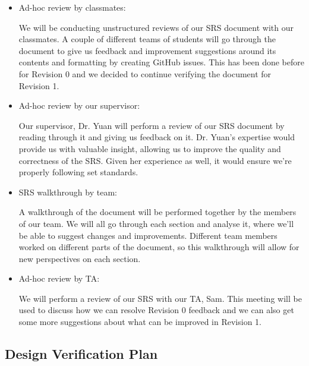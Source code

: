 \documentclass[12pt, titlepage]{article}
\begin{document}
\begin{itemize}
  \item Ad-hoc review by classmates:

      We will be conducting unstructured reviews of our SRS document with our classmates. A couple of different teams of students will go through the document to give us feedback and improvement suggestions around its contents and formatting by creating GitHub issues. This has been done before for Revision 0 and we decided to continue verifying the document for Revision 1.
  
  \item Ad-hoc review by our supervisor:

      Our supervisor, Dr. Yuan will perform a review of our SRS document by reading through it and giving us feedback on it. Dr. Yuan's expertise would provide us with valuable insight, allowing us to improve the quality and correctness of the SRS. Given her experience as well, it would ensure we're properly following set standards.

    \item SRS walkthrough by team:

      A walkthrough of the document will be performed together by the members of our team. We will all go through each section and analyse it, where we'll be able to suggest changes and improvements. Different team members worked on different parts of the document, so this walkthrough will allow for new perspectives on each section.
      
   \item Ad-hoc review by TA:
   
   We will perform a review of our SRS with our TA, Sam. This meeting will be used to discuss how we can resolve Revision 0 feedback and we can also get some more suggestions about what can be improved in Revision 1.

\end{itemize}

\subsection{Design Verification Plan}
\end{document}
